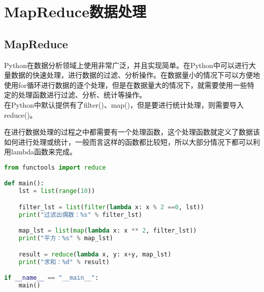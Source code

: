 \section{MapReduce数据处理}

\subsection{MapReduce}

Python在数据分析领域上使用非常广泛，并且实现简单。在Python中可以进行大量数据的快速处理，进行数据的过滤、分析操作。在数据量小的情况下可以方便地使用for循环进行数据的逐个处理，但是在数据量大的情况下，就需要使用一些特定的处理函数进行过滤、分析、统计等操作。\\

在Python中默认提供有了filter()、map()，但是要进行统计处理，则需要导入reduce()。

\begin{table}[H]
	\centering
	\caption{MapReduce数据处理函数}
\end{table}

在进行数据处理的过程之中都需要有一个处理函数，这个处理函数就定义了数据该如何进行处理或统计，一般而言这样的函数都比较短，所以大部分情况下都可以利用lambda函数来完成。\\


\begin{lstlisting}[language=Python]
from functools import reduce

def main():
    lst = list(range(10))

    filter_lst = list(filter(lambda x: x % 2 ==0, lst))
    print("过滤出偶数：%s" % filter_lst)

    map_lst = list(map(lambda x: x ** 2, filter_lst))
    print("平方：%s" % map_lst)

    result = reduce(lambda x, y: x+y, map_lst)
    print("求和：%d" % result)

if __name__ == "__main__":
    main()
\end{lstlisting}

